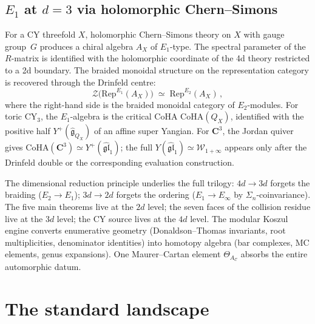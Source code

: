 \documentclass[11pt,reqno]{amsart}
\theoremstyle{definition}
\theoremstyle{remark}
\newcommand{\cW}{\mathcal{W}}
\newcommand{\fg}{\mathfrak{g}}
\renewcommand{\Bbbk}{\mathbf{C}}
\numberwithin{equation}{section}
\begin{document}
\subsection{$E_1$ at $d = 3$ via holomorphic Chern--Simons}
\label{ssec:e1-holcs}

For a CY threefold $X$, holomorphic Chern--Simons theory
on $X$ with gauge group~$G$ produces a chiral algebra
$A_X$ of $E_1$-type. The spectral parameter of the
$R$-matrix is identified with the holomorphic coordinate
of the 4d theory restricted to a 2d boundary. The
braided monoidal structure on the representation category is
recovered through the Drinfeld centre:
\begin{equation}\label{eq:drinfeld-centre}
\mathcal{Z}\bigl(\mathrm{Rep}^{E_1}(A_X)\bigr)
\;\simeq\;
\mathrm{Rep}^{E_2}(A_X)\,,
\end{equation}
where the right-hand side is the braided monoidal category of
$E_2$-modules. For toric CY$_3$, the $E_1$-algebra is the
critical CoHA $\mathrm{CoHA}(Q_X)$, identified with the positive
half $Y^+(\widehat{\fg}_{Q_X})$ of an affine super Yangian. For
$\Bbbk^3$, the Jordan quiver gives
$\mathrm{CoHA}(\Bbbk^3)\simeq Y^+(\widehat{\mathfrak{gl}}_1)$;
the full $Y(\widehat{\mathfrak{gl}}_1)\simeq \cW_{1+\infty}$
appears only after the Drinfeld double or the corresponding
evaluation construction.

The dimensional reduction principle underlies the full trilogy:
$4d \to 3d$ forgets the braiding ($E_2 \to E_1$); $3d \to 2d$
forgets the ordering ($E_1 \to E_\infty$ by
$\Sigma_n$-coinvariance). The five main theorems live at the
$2d$ level; the seven faces of the collision residue live at
the $3d$ level; the CY source lives at the $4d$ level. The
modular Koszul engine converts enumerative geometry
(Donaldson--Thomas invariants, root multiplicities, denominator
identities) into homotopy algebra (bar complexes, MC elements,
genus expansions). One Maurer--Cartan element
$\Theta_{A_\mathcal{C}}$ absorbs the entire automorphic datum.


\section{The standard landscape}
\label{sec:landscape}
\end{document}
